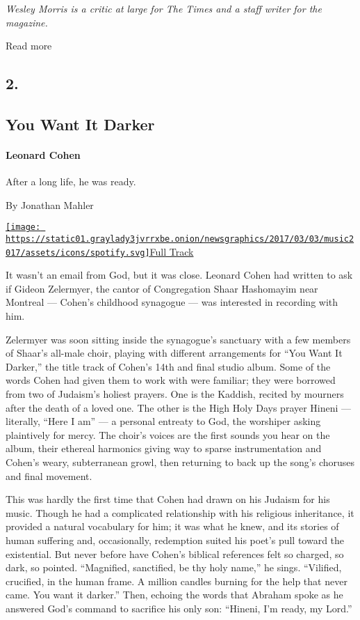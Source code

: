 \emph{Wesley Morris is a critic at large for The Times and a staff
writer for the magazine.}

Read more

\hypertarget{2}{%
\subsection{2.}\label{2}}

\hypertarget{--you-want-it-darker}{%
\subsection{\texorpdfstring{ You Want It
Darker}{  You Want It Darker}}\label{--you-want-it-darker}}

\hypertarget{leonard-cohen}{%
\paragraph{Leonard Cohen}\label{leonard-cohen}}

After a long life, he was ready.

By Jonathan Mahler

\href{https://open.spotify.com/track/5zb7npjQqoJ7Kcpq4yD9qn}{\texttt{[image: https://static01.graylady3jvrrxbe.onion/newsgraphics/2017/03/03/music2017/assets/icons/spotify.svg]}Full
Track}

It wasn't an email from God, but it was close. Leonard Cohen had written
to ask if Gideon Zelermyer, the cantor of Congregation Shaar Hashomayim
near Montreal --- Cohen's childhood synagogue --- was interested in
recording with him.

Zelermyer was soon sitting inside the synagogue's sanctuary with a few
members of Shaar's all-male choir, playing with different arrangements
for ``You Want It Darker,'' the title track of Cohen's 14th and final
studio album. Some of the words Cohen had given them to work with were
familiar; they were borrowed from two of Judaism's holiest prayers. One
is the Kaddish, recited by mourners after the death of a loved one. The
other is the High Holy Days prayer Hineni --- literally, ``Here I am''
--- a personal entreaty to God, the worshiper asking plaintively for
mercy. The choir's voices are the first sounds you hear on the album,
their ethereal harmonics giving way to sparse instrumentation and
Cohen's weary, subterranean growl, then returning to back up the song's
choruses and final movement.

This was hardly the first time that Cohen had drawn on his Judaism for
his music. Though he had a complicated relationship with his religious
inheritance, it provided a natural vocabulary for him; it was what he
knew, and its stories of human suffering and, occasionally, redemption
suited his poet's pull toward the existential. But never before have
Cohen's biblical references felt so charged, so dark, so pointed.
``Magnified, sanctified, be thy holy name,'' he sings. ``Vilified,
crucified, in the human frame. A million candles burning for the help
that never came. You want it darker.'' Then, echoing the words that
Abraham spoke as he answered God's command to sacrifice his only son:
``Hineni, I'm ready, my Lord.''

